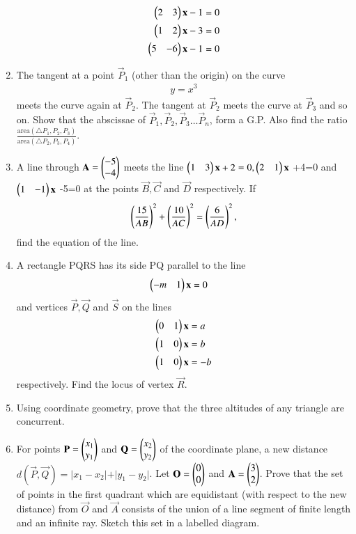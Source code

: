 \begin{enumerate}[label=\arabic*.,ref=\thesubsection.\theenumi]
    \begin{align}\begin{pmatrix}2 & 3\end{pmatrix} \mathbf {x} -1 &= 0  \\ \begin{pmatrix}1 & 2\end{pmatrix} \mathbf {x} -3 &= 0 \\ \begin{pmatrix}5 & -6\end{pmatrix} \mathbf {x} -1 &= 0 \end{align}
    \item The tangent at a point $\vec{P}_1$ (other than the origin) on the curve 
    \begin{align}y = x^3 \end{align} meets the curve again at $\vec{P}_2$. The tangent at $\vec{P}_2$ meets the curve at $\vec{P}_3$ and so on. Show that the abscissae of $\vec{P}_1,\vec{P}_2,\vec{P}_3 \dots \vec{P}_n$, form a G.P. Also find the ratio $\frac{\text{area}(\triangle P_1,P_2,P_3)}{\text{area}(\triangle P_2,P_3,P_4)}$.
    \item A line through $\mathbf{A}=\begin{pmatrix}-5\\-4\end{pmatrix}$ meets the line $\begin{pmatrix}1 & 3\end{pmatrix}\mathbf {x}+2=0,\begin{pmatrix}2 &1\end{pmatrix} \mathbf {x}$ +4=0 and $\begin{pmatrix}1 & -1\end{pmatrix}\mathbf {x}$ -5=0 at the points $\vec{B},\vec{C}$ and $\vec{D}$ respectively. If
\begin{align}
\left(\frac{15}{AB}\right)^2+\left(\frac{10}{AC}\right)^2 = \left(\frac{6}{AD}\right)^2,
\end{align}
find the equation of the line.
    \item A rectangle PQRS has its side PQ parallel to the line \begin{align}\begin{pmatrix}-m & 1\end{pmatrix} \mathbf {x}  &= 0 \end{align} and vertices $\vec{P},\vec{Q}$ and $\vec{S}$ on the lines 
\begin{align}
\begin{pmatrix}0 & 1\end{pmatrix} \mathbf {x}  &= a 
\\
\begin{pmatrix}1 & 0\end{pmatrix} \mathbf {x}  &= b 
\\
\begin{pmatrix}1 & 0\end{pmatrix} \mathbf {x}  &= -b 
\end{align} respectively. Find the locus of vertex $\vec{R}$.
    \item Using coordinate geometry, prove that the three altitudes of any triangle are concurrent.
    \item For points $\mathbf{P}=\begin{pmatrix}x_1\\y_1\end{pmatrix}$ and $\mathbf{Q}=\begin{pmatrix}x_2\\y_2\end{pmatrix}$ of the coordinate plane, a new distance $d(\vec{P},\vec{Q})=\vert x_1-x_2\vert+ \vert y_1-y_2\vert$. Let $\mathbf{O}=\begin{pmatrix}0\\0\end{pmatrix}$ and $\mathbf{A}=\begin{pmatrix}3\\2\end{pmatrix}$. Prove that the set of points in the first quadrant which are equidistant (with respect to the new distance) from $\vec{O}$ and $\vec{A}$ consists of the union of a line segment of finite length and an infinite ray. Sketch this set in a labelled diagram.

\end{enumerate}
